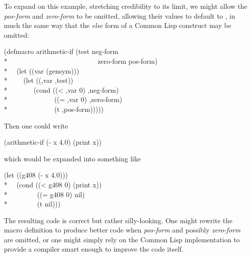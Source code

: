 \begin{defmac}
To expand on this example, stretching credibility to its limit,
we might allow the {\it pos-form}
and {\it zero-form} to be omitted, allowing their values to default to {\nil},
in much the same way that the {\it else} form of a Common Lisp  construct
may be omitted:
\begin{lisp}
(defmacro arithmetic-if (test neg-form \\*
~~~~~~~~~~~~~~~~~~~~~~~~~ zero-form pos-form) \\*
~~(let ((var (gensym))) \\*
~~~~{\Xbq}(let ((,var ,test)) \\*
~~~~~~~(cond ((< ,var 0) ,neg-form) \\*
~~~~~~~~~~~~~((= ,var 0) ,zero-form) \\*
~~~~~~~~~~~~~(t ,pos-form)))))
\end{lisp}
Then one could write
\begin{lisp}
(arithmetic-if (- x 4.0) (print x))
\end{lisp}
which would be expanded into something like
\begin{lisp}
(let ((g408 (- x 4.0))) \\*
~~(cond ((< g408 0) (print x)) \\*
~~~~~~~~((= g408 0) nil) \\*
~~~~~~~~(t nil)))
\end{lisp}
The resulting code is correct but rather silly-looking.
One might rewrite the macro definition to produce better code
when {\it pos-form} and possibly {\it zero-form} are omitted,
or one might simply rely on the Common Lisp implementation to provide
a compiler smart enough to improve the code itself.


\end{defmac}
